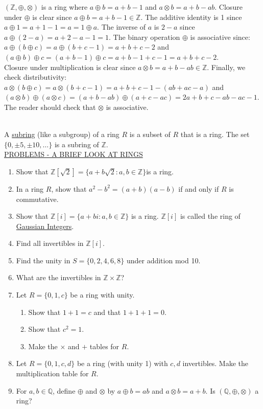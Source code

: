 \documentclass[12pt]{book}
\theoremstyle{definition}
\def\Z{\mathbb{Z}}
\begin{document}
\begin{tcexample}{}{}
$ (\Z,\oplus,\otimes) $ is a ring where $ a\oplus b=a+b-1 $ and $ a\otimes b= a+b-ab $. Closure under $ \oplus $ is clear since $ a\oplus b= a+b-1\in \Z $. The additive identity is 1 since $ a\oplus 1 = a+1-1=a=1\oplus a$. The inverse of $ a $ is $ 2-a $ since $ a\oplus (2-a)=a+2-a-1=1. $ The binary operation $ \oplus $ is associative since:\\
$ a\oplus(b\oplus c)=a\oplus (b+c-1)=a+b+c-2 $ and $ (a\oplus b)\oplus c= (a+b-1)\oplus c= a+b-1+c-1=a+b+c-2. $\\
Closure under multiplication is clear since $ a \otimes b= a+b-ab\in \Z $. Finally, we check distributivity: $ a\otimes (b \oplus c)= a \otimes (b+c-1)= a+b+c-1-(ab+ac-a) $ and $ ( a \otimes b)\oplus (a \otimes c)= (a+b-ab)\oplus (a+c-ac)= 2a+b+c-ab-ac-1. $ The reader should check that $ \otimes $ is associative.
\end{tcexample}
~\\
A \underline{subring} (like a subgroup) of a ring $R$ is a subset of $R$ that is a ring.  The set $\{0,\pm5,\pm10,\dots\}$ is a subring of $\Z$.\\[.2in]
\underline{PROBLEMS - A BRIEF LOOK AT RINGS}
\begin{enumerate}
\item Show that $\Z[\sqrt2]=\{a+b\sqrt2:a,b\in \Z\} $is a ring.
\item In a ring $R$, show that $a^2-b^2=(a+b)(a-b)$ if and only if $R$ is commutative.
\item Show that $\Z[i]=\{a+bi: a,b \in \Z\}$ is  a ring.  $\Z[i]$ is called the ring of \underline{Gaussian Integers}.
\item Find all invertibles in $\Z[i]$.
\item Find the unity in $S=\{0,2,4,6,8\}$ under addition mod 10.
\item What are the invertibles in $\Z\times \Z$?
\item Let $R=\{0,1,c\}$ be a ring with unity.
\begin{enumerate}
\item Show that $1+1=c$ and that $1+1+1=0$.
\item Show that $c^2=1$.
\item Make the $\times$ and $+$ tables for $R$.
\end{enumerate}
\item Let $R=\{0,1,c,d\}$ be a ring (with unity 1) with $c,d$ invertibles.  Make the multiplication table for $R$.
\item For $ a,b\in \mathbb{Q} $, define $ \oplus $ and $ \otimes $ by $ a\oplus b=ab $ and $a \otimes b =a+b$. Is $ (\mathbb{Q},\oplus,\otimes) $ a ring?
\end{enumerate}
\end{document}
